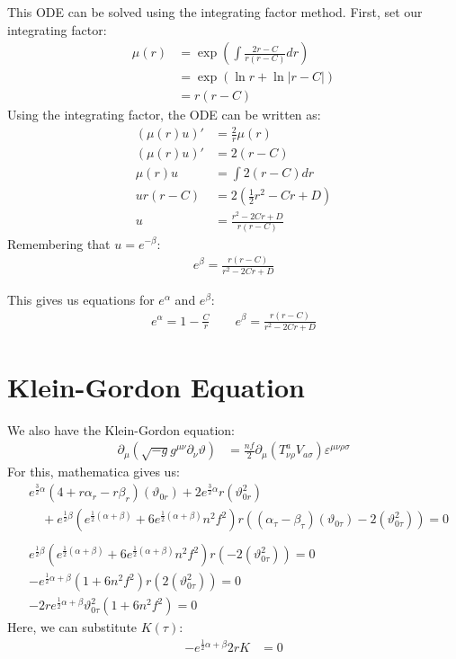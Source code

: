 \documentclass[12pt]{article}
\begin{document}
This ODE can be solved using the integrating factor method. First, set our integrating factor:
\begin{align*}
  \mu(r) &= \exp\left(\int \frac{2r-C}{r(r-C)} dr\right) \\
  &= \exp(\ln{r} + \ln|r-C|) \\
  &= r(r-C)
\end{align*}
Using the integrating factor, the ODE can be written as:
\begin{align*}
  (\mu(r)u)' &= \frac{2}{r}\mu(r) \\
  (\mu(r)u)' &= 2(r-C) \\
  \mu(r)u &= \int 2(r-C) dr \\
  ur(r-C) &= 2\left(\frac{1}{2}r^2 - Cr + D\right) \\
  u &= \frac{r^2 - 2Cr + D}{r(r-C)}
\end{align*}
Remembering that $u = e^{-\beta}$:
\begin{align}
  e^\beta = \frac{r(r-C)}{r^2 - 2Cr + D}
\end{align}

This gives us equations for $e^\alpha$ and $e^\beta$:
\begin{align*}
  e^\alpha = 1 - \frac{C}{r} \qquad e^\beta = \frac{r(r-C)}{r^2 - 2Cr + D}
\end{align*}

\section*{Klein-Gordon Equation}

We also have the Klein-Gordon equation:
\begin{align*}
  \partial_\mu\left(\sqrt{-g}g^{\mu\nu}\partial_\nu \vartheta \right) &= \frac{\mathit{nf}}{2} \partial_\mu\left(T_{\nu\rho}^a V_{a\sigma}\right) \varepsilon^{\mu\nu\rho\sigma}
\end{align*}
For this, mathematica gives us:
\begin{align*}
  &e^{\frac{3}{2}\alpha}(4 + r\alpha_r - r\beta_r)(\vartheta_{0r}) + 2e^{\frac{3}{2}\alpha}r(\vartheta_{0r}^2) \\ & \quad + e^{\frac{1}{2}\beta} (e^{\frac{1}{2}(\alpha+\beta)}+6e^{\frac{1}{2}(\alpha+\beta)}n^2f^2)r((\alpha_\tau - \beta_\tau)(\vartheta_{0\tau}) - 2(\vartheta_{0\tau}^2)) = 0 \\ \\
  &e^{\frac{1}{2}\beta} (e^{\frac{1}{2}(\alpha+\beta)}+6e^{\frac{1}{2}(\alpha+\beta)}n^2f^2)r(- 2(\vartheta_{0\tau}^2)) = 0 \\
  &- e^{\frac{1}{2}\alpha + \beta} (1+6n^2f^2)r(2(\vartheta_{0\tau}^2)) = 0 \\
  &- 2re^{\frac{1}{2}\alpha + \beta} \vartheta_{0\tau}^2(1+6n^2f^2) = 0
\end{align*}
Here, we can substitute $K(\tau)$:
\begin{align}
  - e^{\frac{1}{2}\alpha + \beta}2rK &= 0
\end{align}
\end{document}
